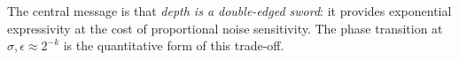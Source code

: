 \documentclass[10pt,twocolumn]{article}
\begin{document}
The central message is that \emph{depth is a double-edged sword}: it provides exponential
expressivity at the cost of proportional noise sensitivity. The phase transition at
$\sigma, \epsilon \approx 2^{-k}$ is the quantitative form of this trade-off.



\end{document}
